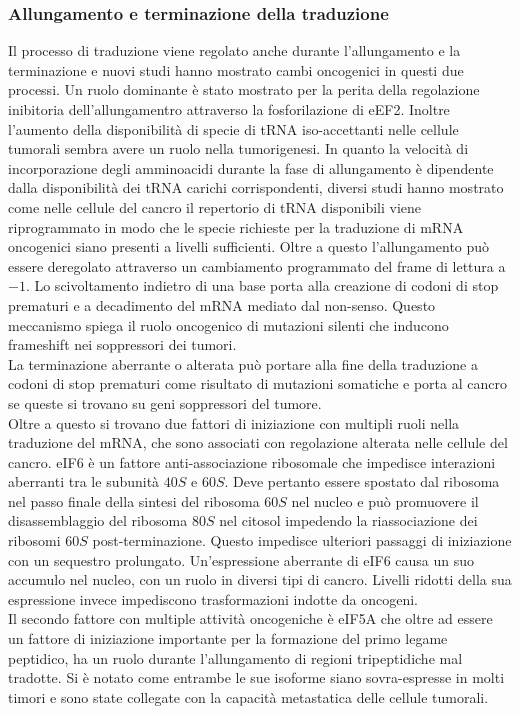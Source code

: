 		\subsubsection{Allungamento e terminazione della traduzione}
		Il processo di traduzione viene regolato anche durante l'allungamento e la terminazione e nuovi studi hanno mostrato cambi oncogenici in questi due processi.
		Un ruolo dominante \`e stato mostrato per la perita della regolazione inibitoria dell'allungamentro attraverso la fosforilazione di eEF2.
		Inoltre l'aumento della disponibilit\`a di specie di tRNA iso-accettanti nelle cellule tumorali sembra avere un ruolo nella tumorigenesi.
		In quanto la velocit\`a di incorporazione degli amminoacidi durante la fase di allungamento \`e dipendente dalla disponibilit\`a dei tRNA carichi corrispondenti, diversi studi hanno mostrato come nelle cellule del cancro il repertorio di tRNA disponibili viene riprogrammato in modo che le specie richieste per la traduzione di mRNA oncogenici siano presenti a livelli sufficienti.
		Oltre a questo l'allungamento pu\`o essere deregolato attraverso un cambiamento programmato del frame di lettura a $-1$.
		Lo scivoltamento indietro di una base porta alla creazione di codoni di stop prematuri e a decadimento del mRNA mediato dal non-senso.
		Questo meccanismo spiega il ruolo oncogenico di mutazioni silenti che inducono frameshift nei soppressori dei tumori.\\
		La terminazione aberrante o alterata pu\`o portare alla fine della traduzione a codoni di stop prematuri come risultato di mutazioni somatiche e porta al cancro se queste si trovano su geni soppressori del tumore.\\
		Oltre a questo si trovano due fattori di iniziazione con multipli ruoli nella traduzione del mRNA, che sono associati con regolazione alterata nelle cellule del cancro.
		eIF6 \`e un fattore anti-associazione ribosomale che impedisce interazioni aberranti tra le subunit\`a $40S$ e $60S$.
		Deve pertanto essere spostato dal ribosoma nel passo finale della sintesi del ribosoma $60S$ nel nucleo e pu\`o promuovere il disassemblaggio del ribosoma $80S$ nel citosol impedendo la riassociazione dei ribosomi $60S$ post-terminazione.
		Questo impedisce ulteriori passaggi di iniziazione con un sequestro prolungato.
		Un'espressione aberrante di eIF6 causa un suo accumulo nel nucleo, con un ruolo in diversi tipi di cancro.
		Livelli ridotti della sua espressione invece impediscono trasformazioni indotte da oncogeni.\\
		Il secondo fattore con multiple attivit\`a oncogeniche \`e eIF5A che oltre ad essere un fattore di iniziazione importante per la formazione del primo legame peptidico, ha un ruolo durante l'allungamento di regioni tripeptidiche mal tradotte.
		Si \`e notato come entrambe le sue isoforme siano sovra-espresse in molti timori e sono state collegate con la capacit\`a metastatica delle cellule tumorali.

